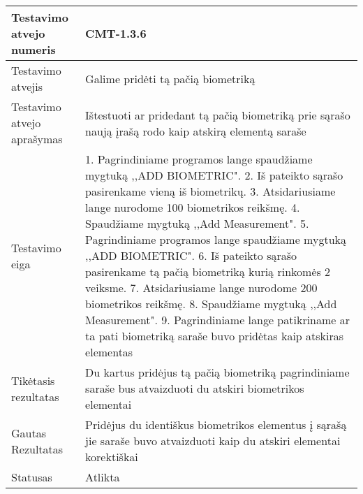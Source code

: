 \documentclass[oneside]{VUMIFPSkursinis}
\begin{document}
\begin{center}
    \begin{tabular}{ |p{5cm}|p{13cm}|}
    \hline
        Testavimo atvejo numeris &  CMT-1.3.6\\ \hline
        Testavimo atvejis & Galime pridėti tą pačią biometriką \\ \hline
        Testavimo atvejo aprašymas & Ištestuoti ar pridedant tą pačią biometriką prie sąrašo naują įrašą rodo kaip atskirą elementą saraše  \\ \hline
        Testavimo eiga &  1. Pagrindiniame programos lange spaudžiame mygtuką ,,ADD BIOMETRIC". 
				2. Iš pateikto sąrašo pasirenkame vieną iš biometrikų. 
				3. Atsidariusiame lange nurodome 100 biometrikos reikšmę.
				4. Spaudžiame mygtuką ,,Add Measurement".
				5. Pagrindiniame programos lange spaudžiame mygtuką ,,ADD BIOMETRIC".
				6. Iš pateikto sąrašo pasirenkame tą pačią biometriką kurią rinkomės 2 veiksme.
				7. Atsidariusiame lange nurodome 200 biometrikos reikšmę.
				8. Spaudžiame mygtuką ,,Add Measurement".
				9. Pagrindiniame lange patikriname ar ta pati biometriką saraše buvo pridėtas kaip atskiras elementas 
			\\ \hline
        Tikėtasis rezultatas &  Du kartus pridėjus tą pačią biometriką pagrindiniame saraše bus atvaizduoti du atskiri biometrikos elementai\\ \hline
        Gautas Rezultatas &  Pridėjus du identiškus biometrikos elementus į sąrašą jie saraše buvo atvaizduoti kaip du atskiri elementai korektiškai\\ \hline
        Statusas & Atlikta \\ \hline
    \hline
    \end{tabular}
\end{center}
\end{document}
